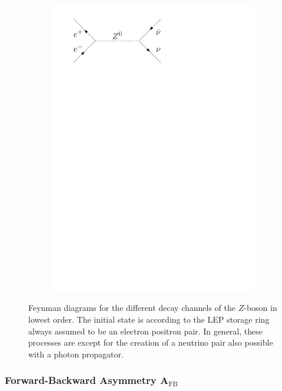 \documentclass[11pt, a4paper]{article}
\numberwithin{equation}{section}
\begin{document}
\begin{figure}[htb]
\begin{subfigure}{.32\textwidth}
		\includegraphics[width=.9\textwidth]{./figures/theory/feynman/nn}
	\end{subfigure}
	\caption{Feynman diagrams for the different decay channels of the $Z$-boson in lowest order. The initial state is according to the LEP storage ring always assumed to be an electron positron pair. In general, these processes are except for the creation of a neutrino pair also possible with a photon propagator.}
	\label{fig:feynman}
\end{figure}

\subsubsection{Forward-Backward Asymmetry A$_\mathrm{FB}$}
\end{document}
